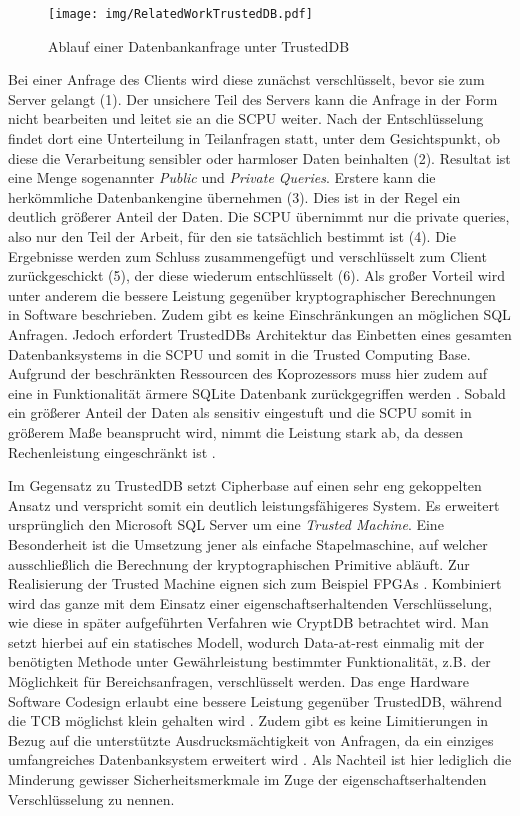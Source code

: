 \begin{figure}[h]
	\texttt{[image: img/RelatedWorkTrustedDB.pdf]}
	\centering
	\caption{Ablauf einer Datenbankanfrage unter TrustedDB}
	\label{fig:trusteddb}
\end{figure}

Bei einer Anfrage des Clients wird diese zunächst verschlüsselt, bevor sie zum Server gelangt (1). Der unsichere Teil des Servers kann die Anfrage in der Form nicht bearbeiten und leitet sie an die SCPU weiter. Nach der Entschlüsselung findet dort eine Unterteilung in Teilanfragen statt, unter dem Gesichtspunkt, ob diese die Verarbeitung sensibler oder harmloser Daten beinhalten (2). Resultat ist eine Menge sogenannter \textit{Public} und \textit{Private Queries}. Erstere kann die herkömmliche Datenbankengine übernehmen (3). Dies ist in der Regel ein deutlich größerer Anteil der Daten. Die SCPU übernimmt nur die private queries, also nur den Teil der Arbeit, für den sie tatsächlich bestimmt ist (4). Die Ergebnisse werden zum Schluss zusammengefügt und verschlüsselt zum Client zurückgeschickt (5), der diese wiederum entschlüsselt (6). Als großer Vorteil wird unter anderem die bessere Leistung gegenüber kryptographischer Berechnungen in Software beschrieben. Zudem gibt es keine Einschränkungen an möglichen \ac{SQL} Anfragen. Jedoch erfordert TrustedDBs Architektur das Einbetten eines gesamten Datenbanksystems in die SCPU und somit in die Trusted Computing Base. Aufgrund der beschränkten Ressourcen des Koprozessors muss hier zudem auf eine in Funktionalität ärmere SQLite Datenbank zurückgegriffen werden \cite{Arasu}. Sobald ein größerer Anteil der Daten als sensitiv eingestuft und die SCPU somit in größerem Maße beansprucht wird, nimmt die Leistung stark ab, da dessen Rechenleistung eingeschränkt ist \cite{Arasu2012}.

Im Gegensatz zu TrustedDB setzt Cipherbase \cite{Arasu2012}\cite{Arasu} auf einen sehr eng gekoppelten Ansatz und verspricht somit ein deutlich leistungsfähigeres System. Es erweitert ursprünglich den Microsoft \ac{SQL} Server um eine \textit{Trusted Machine}. Eine Besonderheit ist die Umsetzung jener als einfache Stapelmaschine, auf welcher ausschließlich die Berechnung der kryptographischen Primitive abläuft. Zur Realisierung der Trusted Machine eignen sich zum Beispiel \acp{FPGA} \cite{Arasu}. Kombiniert wird das ganze mit dem Einsatz einer eigenschaftserhaltenden Verschlüsselung, wie diese in später aufgeführten Verfahren wie CryptDB betrachtet wird. Man setzt hierbei auf ein statisches Modell, wodurch Data-at-rest einmalig mit der benötigten Methode unter Gewährleistung bestimmter Funktionalität, z.B. der Möglichkeit für Bereichsanfragen, verschlüsselt werden. Das enge Hardware Software Codesign erlaubt eine bessere Leistung gegenüber TrustedDB, während die \ac{TCB} möglichst klein gehalten wird \cite{Arasu}. Zudem gibt es keine Limitierungen in Bezug auf die unterstützte Ausdrucksmächtigkeit von Anfragen, da ein einziges umfangreiches Datenbanksystem erweitert wird \cite{Arasu2013}. Als Nachteil ist hier lediglich die Minderung gewisser Sicherheitsmerkmale im Zuge der eigenschaftserhaltenden Verschlüsselung zu nennen.


